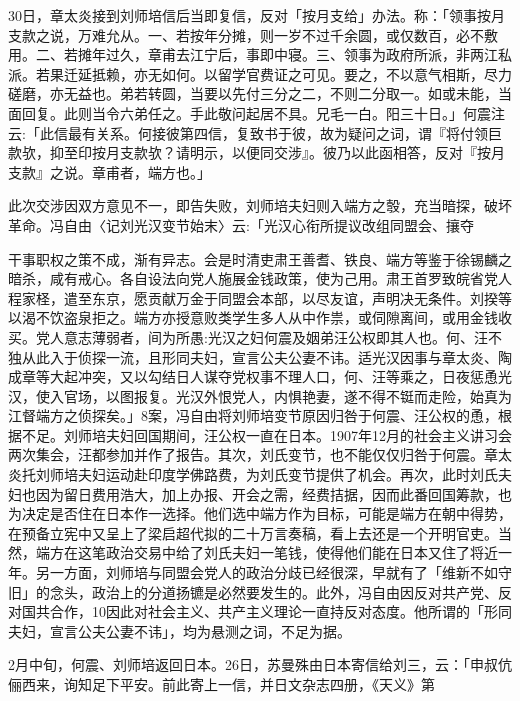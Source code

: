 30日，章太炎接到刘师培信后当即复信，反对「按月支给」办法。称：「领事按月支款之说，万难允从。一、若按年分摊，则一岁不过千余圆，或仅数百，必不敷用。二、若摊年过久，章甫去江宁后，事即中寝。三、领事为政府所派，非两江私派。若果迁延抵赖，亦无如何。以留学官费证之可见。要之，不以意气相斯，尽力磋磨，亦无益也。弟若转圆，当要以先付三分之二，不则二分取一。如或未能，当面回复。此则当令六弟任之。手此敬问起居不具。兄毛一白。阳三十日。」何震注云:「此信最有关系。何接彼第四信，复致书于彼，故为疑问之词，谓『将付领巨款欤，抑至印按月支款欤？请明示，以便同交涉』。彼乃以此函相答，反对『按月支款』之说。章甫者，端方也。」

此次交涉因双方意见不一，即告失败，刘师培夫妇则入端方之彀，充当暗探，破坏革命。冯自由〈记刘光汉变节始末〉云:「光汉心衔所提议改组同盟会、攘夺


\noindent 干事职权之策不成，渐有异志。会是时清吏肃王善耆、铁良、端方等鉴于徐锡麟之暗杀，咸有戒心。各自设法向党人施展金钱政策，使为己用。肃王首罗致皖省党人程家柽，遣至东京，愿贡献万金于同盟会本部，以尽友谊，声明决无条件。刘揆等以渴不饮盗泉拒之。端方亦授意败类学生多人从中作祟，或伺隙离间，或用金钱收买。党人意志薄弱者，间为所愚:光汉之妇何震及姻弟汪公权即其人也。何、汪不独从此入于侦探一流，且形同夫妇，宣言公夫公妻不讳。适光汉因事与章太炎、陶成章等大起冲突，又以勾结日人谋夺党权事不理人口，何、汪等乘之，日夜惩恿光汉，使入官场，以图报复。光汉外恨党人，内惧艳妻，遂不得不铤而走险，始真为江督端方之侦探矣。」8案，冯自由将刘师培变节原因归咎于何震、汪公权的恿，根据不足。刘师培夫妇回国期间，汪公权一直在日本。1907年12月的社会主义讲习会两次集会，汪都参加并作了报告。其次，刘氏变节，也不能仅仅归咎于何震。章太炎托刘师培夫妇运动赴印度学佛路费，为刘氏变节提供了机会。再次，此时刘氏夫妇也因为留日费用浩大，加上办报、开会之需，经费拮据，因而此番回国筹款，也为决定是否住在日本作一选择。他们选中端方作为目标，可能是端方在朝中得势，在预备立宪中又呈上了梁启超代拟的二十万言奏稿，看上去还是一个开明官吏。当然，端方在这笔政治交易中给了刘氏夫妇一笔钱，使得他们能在日本又住了将近一年。另一方面，刘师培与同盟会党人的政治分歧已经很深，早就有了「维新不如守旧」的念头，政治上的分道扬镳是必然要发生的。此外，冯自由因反对共产党、反对国共合作，10因此对社会主义、共产主义理论一直持反对态度。他所谓的「形同夫妇，宣言公夫公妻不讳」，均为悬测之词，不足为据。

2月中旬，何震、刘师培返回日本。26日，苏曼殊由日本寄信给刘三，云：「申叔伉俪西来，询知足下平安。前此寄上一信，并日文杂志四册，《天义》第

\vfill
\begin{BookNotes}
\end{BookNotes}

